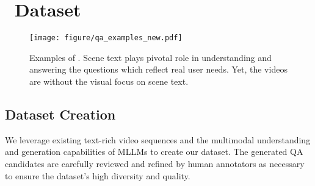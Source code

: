 \section{\dataset~Dataset}

\begin{figure*}
\centering
\texttt{[image: figure/qa\_examples\_new.pdf]}
\caption{Examples of \dataset. Scene text plays pivotal role in understanding and answering the questions which reflect real user needs. Yet, the videos are without the visual focus on scene text.} 
\label{fig:exp}
\vspace{-0.5cm}
\end{figure*}


\subsection{Dataset Creation} 
We leverage existing text-rich video sequences and the multimodal understanding and generation capabilities of MLLMs to create our dataset. The generated QA candidates are carefully reviewed and refined by human annotators as necessary to ensure the dataset's high diversity and quality.

